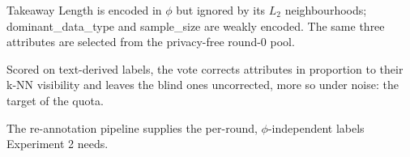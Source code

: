 \documentclass[11pt,aspectratio=169]{beamer}
\begin{document}
\begin{frame}{Takeaway}
Length is encoded in $\phi$ but ignored by its $L_2$ neighbourhoods; dominant\_data\_type and sample\_size are weakly encoded. The same three attributes are selected from the privacy-free round-0 pool.

\medskip
Scored on text-derived labels, the vote corrects attributes in proportion to their k-NN visibility and leaves the blind ones uncorrected, more so under noise: the target of the quota.

\medskip
The re-annotation pipeline supplies the per-round, $\phi$-independent labels Experiment 2 needs.
\end{frame}
\end{document}
